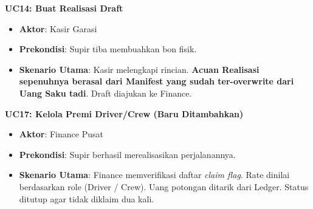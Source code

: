 \documentclass[11pt,a4paper]{article}
\begin{document}
\textbf{UC14: Buat Realisasi Draft}
\begin{itemize}
    \item \textbf{Aktor}: Kasir Garasi
    \item \textbf{Prekondisi}: Supir tiba membuahkan bon fisik.
    \item \textbf{Skenario Utama}: Kasir melengkapi rincian. \textbf{Acuan Realisasi sepenuhnya berasal dari Manifest yang sudah ter-overwrite dari Uang Saku tadi}. Draft diajukan ke Finance.
\end{itemize}

\textbf{UC17: Kelola Premi Driver/Crew (Baru Ditambahkan)}
\begin{itemize}
    \item \textbf{Aktor}: Finance Pusat
    \item \textbf{Prekondisi}: Supir berhasil merealisasikan perjalanannya.
    \item \textbf{Skenario Utama}: Finance memverifikasi daftar \textit{claim flag}. Rate dinilai berdasarkan role (Driver / Crew). Uang potongan ditarik dari Ledger. Status ditutup agar tidak diklaim dua kali.
\end{itemize}
\end{document}
